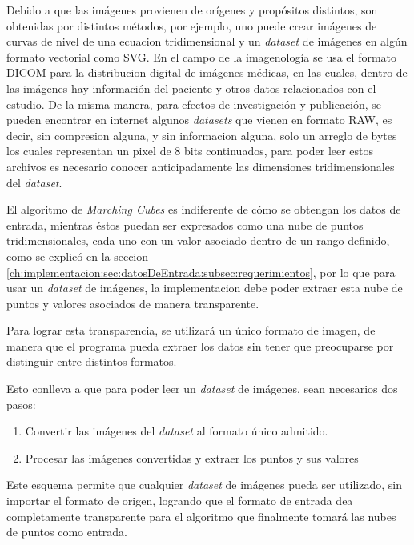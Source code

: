 Debido a que las imágenes provienen de orígenes y propósitos distintos, son obtenidas por distintos métodos, por ejemplo, uno puede crear imágenes de curvas de nivel de una ecuacion tridimensional y un \emph{dataset} de imágenes en algún formato vectorial como SVG. En el campo de la imagenología se usa el formato DICOM para la distribucion digital de imágenes médicas, en las cuales, dentro de las imágenes hay información del paciente y otros datos relacionados con el estudio. De la misma manera, para efectos de investigación y publicación, se pueden encontrar en internet algunos \emph{datasets} que vienen en formato RAW, es decir, sin compresion alguna, y sin informacion alguna, solo un arreglo de bytes los cuales representan un pixel de 8 bits continuados, para poder leer estos archivos es necesario conocer anticipadamente las dimensiones tridimensionales del \emph{dataset}.

El algoritmo de \emph{Marching Cubes} es indiferente de cómo se obtengan los datos de entrada, mientras éstos puedan ser expresados como una nube de puntos tridimensionales, cada uno con un valor asociado dentro de un rango definido, como se explicó en la seccion \ref{ch:implementacion:sec:datosDeEntrada:subsec:requerimientos}, por lo que para usar un \emph{dataset} de imágenes, la implementacion debe poder extraer esta nube de puntos y valores asociados de manera transparente.

Para lograr esta transparencia, se utilizará un único formato de imagen, de manera que el programa pueda extraer los datos sin tener que preocuparse por distinguir entre distintos formatos.

Esto conlleva a que para poder leer un \emph{dataset} de imágenes, sean necesarios dos pasos:

\begin{enumerate}
	\item Convertir las imágenes del \emph{dataset} al formato único admitido.
	\item Procesar las imágenes convertidas y extraer los puntos y sus valores
\end{enumerate}

Este esquema permite que cualquier \emph{dataset} de imágenes pueda ser utilizado, sin importar el formato de origen, logrando que el formato de entrada dea completamente transparente para el algoritmo que finalmente tomará las nubes de puntos como entrada.